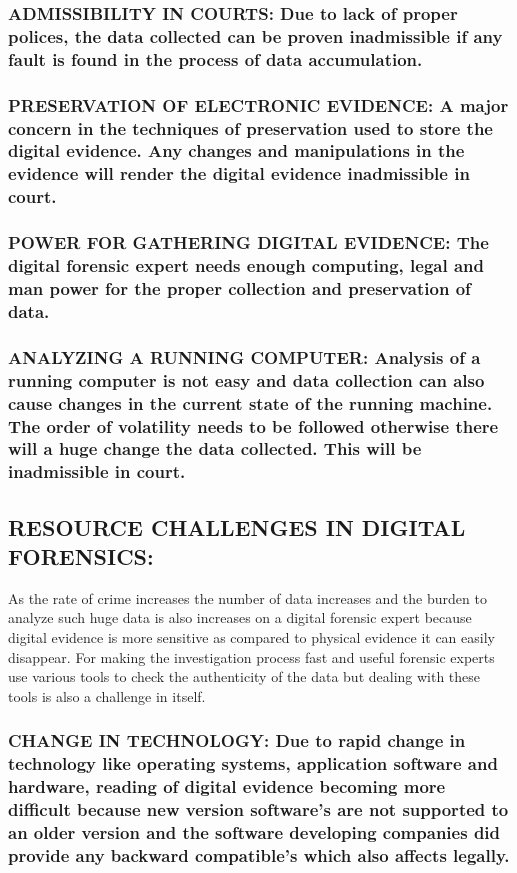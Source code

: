 \documentclass[10pt,british,english]{article}
\begin{document}
\subsubsection{ADMISSIBILITY IN COURTS: Due to lack of proper polices, the data
collected can be proven inadmissible if any fault is found in the
process of data accumulation. }

\subsubsection{PRESERVATION OF ELECTRONIC EVIDENCE: A major concern in the techniques
of preservation used to store the digital evidence. Any changes and
manipulations in the evidence will render the digital evidence inadmissible
in court.}

\subsubsection{POWER FOR GATHERING DIGITAL EVIDENCE: The digital forensic expert
needs enough computing, legal and man power for the proper collection
and preservation of data.}

\subsubsection{ANALYZING A RUNNING COMPUTER: Analysis of a running computer is not
easy and data collection can also cause changes in the current state
of the running machine. The order of volatility needs to be followed
otherwise there will a huge change the data collected. This will be
inadmissible in court.}

\pagebreak{}

\subsection{RESOURCE CHALLENGES IN DIGITAL FORENSICS:}

As the rate of crime increases the number of data increases and the
burden to analyze such huge data is also increases on a digital forensic
expert because digital evidence is more sensitive as compared to physical
evidence it can easily disappear. For making the investigation process
fast and useful forensic experts use various tools to check the authenticity
of the data but dealing with these tools is also a challenge in itself. 

\subsubsection{CHANGE IN TECHNOLOGY: Due to rapid change in technology like operating
systems, application software and hardware, reading of digital evidence
becoming more difficult because new version software\textquoteright s
are not supported to an older version and the software developing
companies did provide any backward compatible\textquoteright s which
also affects legally.}
\end{document}
